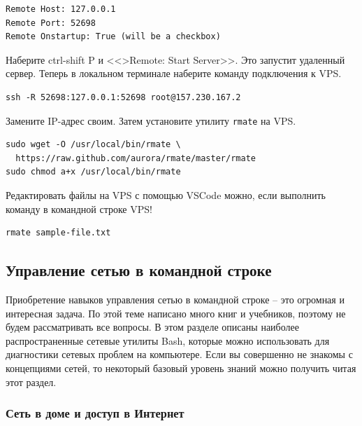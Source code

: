 \documentclass[12pt]{article}
\begin{document}
\begin{verbatim}
Remote Host: 127.0.0.1
Remote Port: 52698
Remote Onstartup: True (will be a checkbox)
\end{verbatim}

Наберите ctrl-shift P и <<\textgreater Remote: Start Server>>. Это
запустит удаленный сервер. Теперь в локальном терминале наберите команду
подключения к VPS.

\begin{verbatim}
ssh -R 52698:127.0.0.1:52698 root@157.230.167.2
\end{verbatim}

Замените IP-адрес своим. Затем установите утилиту \texttt{rmate} на VPS.

\begin{verbatim}
sudo wget -O /usr/local/bin/rmate \
  https://raw.github.com/aurora/rmate/master/rmate
sudo chmod a+x /usr/local/bin/rmate
\end{verbatim}

Редактировать файлы на VPS с помощью VSCode можно, если выполнить
команду в командной строке VPS!

\begin{verbatim}
rmate sample-file.txt
\end{verbatim}

\hypertarget{Networking-on-Command-Line}{%
\subsection{\texorpdfstring{\protect\hyperlink{Networking-on-Command-Line}{}Управление
сетью в командной
строке}{Управление сетью в командной строке}}\label{Networking-on-Command-Line}}

Приобретение навыков управления сетью в командной строке -- это огромная
и интересная задача. По этой теме написано много книг и учебников,
поэтому не будем рассматривать все вопросы. В этом разделе описаны
наиболее распространенные сетевые утилиты Bash, которые можно
использовать для диагностики сетевых проблем на компьютере. Если вы
совершенно не знакомы с концепциями сетей, то некоторый базовый уровень
знаний можно получить читая этот раздел.

\hypertarget{Your-home-network-and-the-internet}{%
\subsubsection{\texorpdfstring{\protect\hyperlink{Your-home-network-and-the-internet}{}Сеть
в доме и доступ в
Интернет}{Сеть в доме и доступ в Интернет}}\label{Your-home-network-and-the-internet}}
\end{document}
